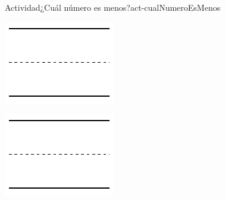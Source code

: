 \documentclass[20pt]{extarticle}
\begin{document}
\begin{activity}{Actividad}{¿Cuál número es menos?}{act-cualNumeroEsMenos}
\vspace{1cm}
\begin{sidebyside}{2}{0.1}{0.1}{0.2}%
\begin{sbspanel}{0.3}%
\includegraphics[max width=\linewidth, center]{external/svg-source/tikz-file-148545.pdf}
\end{sbspanel}%
\begin{sbspanel}{0.3}%
\includegraphics[max width=\linewidth, center]{external/svg-source/tikz-file-148545.pdf}
\end{sbspanel}%
\end{sidebyside}%
\vspace{1cm}
\begin{sidebyside}{2}{0.1}{0.1}{0.2}%
\begin{sbspanel}{0.3}%

\end{sbspanel}
\end{sidebyside}
\end{activity}
\end{document}
